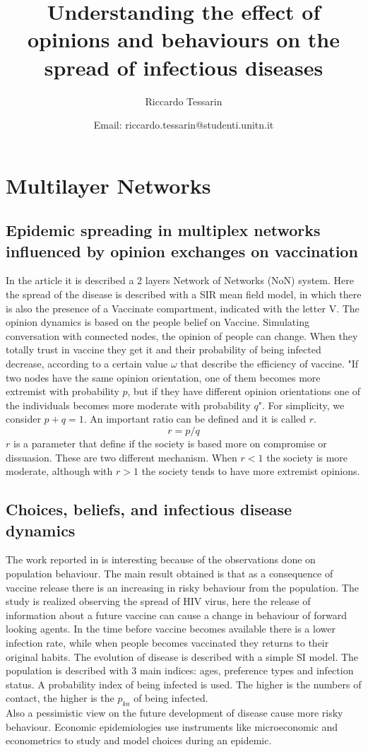 \documentclass[a4paper,11pt]{scrartcl}
\title{Understanding the effect of opinions and behaviours on the spread of infectious diseases}
\subtitle{ }
\author{Riccardo Tessarin}
\date{ Email: riccardo.tessarin@studenti.unitn.it }
\begin{document}
	
	\maketitle
	
	
\section{Multilayer Networks}

	\subsection{Epidemic spreading in multiplex networks influenced by opinion exchanges on vaccination}
	In the article \cite{AlvarezZuzek2017} it is described a 2 layers Network of Networks (NoN) system.
	Here the spread of the disease is described with a SIR mean field model, in which there is also the presence of a Vaccinate compartment, indicated with the letter V. 
	The opinion dynamics is based on the people belief on Vaccine. Simulating conversation with connected nodes, the opinion of people can change. When they totally trust in vaccine they get it and their probability of being infected decrease, according to a certain value $\omega$ that describe the efficiency of vaccine.
	"If two nodes have the same opinion orientation, one of them becomes more extremist with
	probability $p$, but if they have different opinion orientations one of the individuals becomes	more moderate with probability $q$". For simplicity, we consider $p + q = 1$. An important ratio can be defined and it is called $r$.
	\[r = p/q\] 
	$r$ is a parameter that define if the society is based more on compromise or dissuasion. These are two different mechanism. When $r<1$ the society is more moderate, although with $r>1$ the society tends to have more extremist opinions.
		
	\subsection{Choices, beliefs, and infectious disease dynamics }
	The work reported in \cite{AAuld2003} is interesting because  of the observations done on population behaviour. The main result obtained is that as a consequence of vaccine release there is an increasing in risky behaviour from the population. 
	The study is realized observing the spread of HIV virus, here the release of information about a future vaccine can cause a change in behaviour of forward looking agents. In the time before vaccine becomes available there is a lower infection rate, while when people becomes vaccinated they returns to their original habits. 
	The evolution of disease is described with a simple SI model. The population is described with 3 main indices: ages, preference types and infection status. A probability index of being infected is used. The higher is the numbers of contact, the higher is the $p_{ka}$ of being infected. \\
	Also a pessimistic view on the future development of disease cause more risky behaviour.
	Economic epidemiologies use instruments like microeconomic and econometrics to study and model choices during an epidemic. 
	
\end{document}
